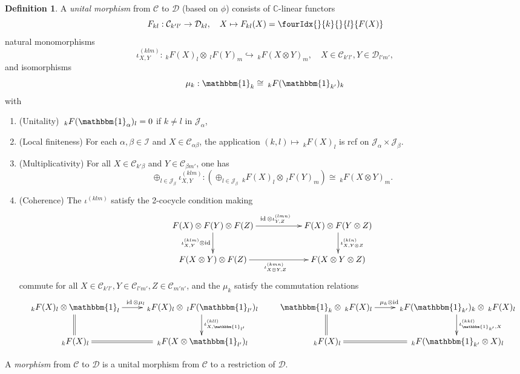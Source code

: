 \documentclass[11pt]{article}
\DeclareMathOperator{\id}{id}
\newcommand{\C}{\mathbb{C}}
\newcommand{\CatC}{\mathcal{C}}
\newcommand{\CatD}{\mathcal{D}}
\newcommand{\CatCC}{\mathscr{C}}
\newcommand{\CatDD}{\mathscr{D}}
\newcommand{\GrDA}[3]{{}_{\;#2}#1_{#3}} %
\newcommand{\Unitb}{\mathbbm{1}}
\newcommand{\Gr}[5]{\fourIdx{#2}{#4}{#3}{#5}{#1}}%
\newcommand{\Gru}[3]{\Gr{#1}{}{}{#2}{#3}}
\theoremstyle{definition}
\newtheorem{Def}[Theorem]{Definition}
\numberwithin{equation}{section}
\begin{document}
\begin{Def}
A \emph{unital morphism} from $\CatCC$ to $\CatDD$ (based on $\phi$) consists of $\C$-linear functors \[F_{kl}: \CatC_{k'l'}\rightarrow \CatD_{kl},\quad X\mapsto F_{kl}(X) = \Gru{F(X)}{k}{l}\] natural monomorphisms \[\iota^{(klm)}_{X,Y}: \GrDA{F(X)}{k}{l} \otimes \GrDA{F(Y)}{l}{m} \hookrightarrow \GrDA{F(X\otimes Y)}{k}{m}, \quad X\in \CatC_{k'l'},Y\in \CatD_{l'm'},\] and isomorphisms \[\mu_{k}:  \Unitb_k \cong \GrDA{F(\Unitb_{k'})}{k}{k}\] with \begin{enumerate}[label=(\arabic*)]
\item (Unitality)  $\GrDA{F(\Unitb_{\alpha})}{k}{l}= 0$ if $k\neq l$ in $\mathscr{J}_\alpha$,
\item (Local finiteness) For each $\alpha,\beta\in \mathscr{I}$ and $X\in \CatC_{\alpha\beta}$, the application $(k,l)\mapsto \GrDA{F(X)}{k}{l}$ is rcf on $\mathscr{J}_{\alpha}\times \mathscr{J}_{\beta}$. 
\item (Multiplicativity) For all $X\in \CatC_{k'\beta}$ and $Y\in \CatC_{\beta m'}$, one has\[\oplus_{l\in \mathscr{J}_\beta} \iota^{(klm)}_{X,Y}: \left(\oplus_{l\in \mathscr{J}_\beta} \GrDA{F(X)}{k}{l} \otimes \GrDA{F(Y)}{l}{m}\right) \cong \GrDA{F(X\otimes Y)}{k}{m}.\]
\item (Coherence) The $\iota^{(klm)}$ satisfy the 2-cocycle condition making \[\xymatrix{F(X)\otimes F(Y)\otimes F(Z) \ar[rr]^{\id\otimes \iota^{(lmn)}_{Y,Z}} \ar[d]_{\iota^{(klm)}_{X,Y}\otimes\id}&& F(X)\otimes F(Y\otimes Z)\ar[d]^{\iota^{(kln)}_{X,Y\otimes Z}}\\ F(X\otimes Y)\otimes F(Z) \ar[rr]_{\iota^{(kmn)}_{X\otimes Y,Z}}&& F(X\otimes Y \otimes Z)}\] commute for all $X\in \CatC_{k'l'},Y\in \CatC_{l'm'}, Z\in \CatC_{m'n'}$, and the $\mu_k$ satisfy the commutation relations \[\xymatrix{ \GrDA{F(X)}{k}{l}\otimes \Unitb_l \ar[r]^{\!\!\!\!\id\otimes \mu_l} \ar@{=}[d] & \GrDA{F(X)}{k}{l} \otimes \GrDA{F(\Unitb_{l'})}{l}{l} \ar[d]^{\iota^{(kll)}_{X, \Unitb_{l'}}} \\ \GrDA{F(X)}{k}{l} & \ar@{=}[l] \GrDA{F(X\otimes \Unitb_{l'})}{k}{l}} \qquad \xymatrix{  \Unitb_k\otimes \GrDA{F(X)}{k}{l}\ar[r]^{\!\!\!\!\mu_k\otimes \id} \ar@{=}[d] & \GrDA{F(\Unitb_{k'})}{k}{k} \otimes \GrDA{F(X)}{k}{l} \ar[d]^{\iota^{(kkl)}_{\Unitb_{k'},X}} \\ \GrDA{F(X)}{k}{l} & \ar@{=}[l] \GrDA{ F(\Unitb_{k'}\otimes X)}{k}{l}} \]
\end{enumerate}

A \emph{morphism} from $\CatCC$ to $\CatDD$ is a unital morphism from $\CatCC$ to a restriction of $\CatDD$. 
\end{Def}
\end{document}
